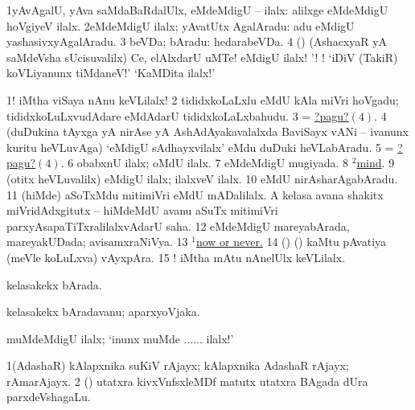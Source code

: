 \bentry
{}
\gl{\kirxvi}
\bmng
\bnum
\num{1}yAvAgalU, yAva saMdaBaRdalUlx, eMdeMdigU -- ilalx:  alilxge eMdeMdigU hoVgiyeV ilalx. 
\num{2}eMdeMdigU ilalx; yAvatUtx AgalAradu:  adu eMdigU yashasivxyAgalAradu. 
\num{3} beVDa; bAradu:  hedarabeVDa. 
\num{4} (\AmA) (AshacxyaR yA saMdeVsha sUcisuvalilx) Ce, elAlxdarU uMTe! eMdigU ilalx! '! ! `iDiV (TakiR) koVLiyanunx tiMdaneV!' `KaMDita ilalx!' 
\enum
\emng

\noindent
\gl{\pagu}
\bmng
\bnum
\num{1}! iMtha viSaya nAnu keVLilalx! 
\num{2}  tididxkoLaLxlu eMdU kAla miVri hoVgadu; tididxkoLuLxvudAdare eMdAdarU tididxkoLaLxbahudu. 
\num{3}  = \hyperlink{never pagu4}{?pagu?\((4)\)}. 
\hypertarget{never pagu4}{} 
\num{4} (duDukina tAyxga yA nirAse yA AshAdAyakavalalxda BaviSayx vANi -- ivanunx kuritu heVLuvAga) `eMdigU sAdhayxvilalx' eMdu duDuki heVLabAradu. 
\num{5}  = \hyperlink{never pagu4}{?pagu?\((4)\)}. 
\num{6}  obabxnU ilalx; oMdU ilalx. 
\num{7}  eMdeMdigU mugiyada. 
\num{8}  \hyperref{kandict_m.pdf}{M}{mind(2) pagu(6)}{$^2$mind}. 
\num{9} (otitx heVLuvalilx) eMdigU ilalx; ilalxveV ilalx. 
\num{10}  eMdU nirAsharAgabAradu. 
\num{11} (hiMde) aSoTxMdu mitimiVri eMdU mADalilalx. A kelasa avana shakitx miVridAdxgitutx -- hiMdeMdU avanu aSuTx mitimiVri parxyAsapaTiTxralilalxvAdarU saha. 
\num{12}  eMdeMdigU mareyabArada, mareyakUDada; avisamxraNiVya. 
\num{13} \hyperlink{now(1) pagu(7)}{$^1$now or never.} 
\num{14} (\birx) (\AmA) kaMtu pAvatiya (meVle koLuLxva) vAyxpAra. 
\num{15} ! iMtha mAtu nAnelUlx keVLilalx. 
\enum
\emng
\eentry

\bentry
{}
\gl{\gu}
\bmng
kelasakekx bArada. 
\emng
\eentry

\bentry
{}
\gl{\nA}
\bmng
kelasakekx bAradavanu; aparxyoVjaka. 
\emng
\eentry

\bentry
{}
\gl{\kirxvi}
\bmng
muMdeMdigU ilalx; `inunx muMde ...... ilalx!' 
\emng
\eentry

\bentry
{}
\gl{\nA}
\bmng
\bnum
\num{1}(AdashaR) kAlapxnika suKiV rAjayx; kAlapxnika AdashaR rAjayx; rAmarAjayx. 
\num{2} (\AseTxrXV) utatxra kivxVnfsxleMDf matutx utatxra BAgada dUra parxdeVshagaLu. 
\enum
\emng
\eentry

